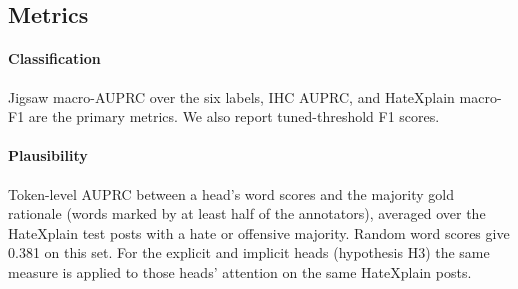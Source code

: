 \documentclass[preprint,12pt,authoryear]{elsarticle}
\begin{document}
\begin{table}[t]
\centering
\caption{Models compared. All use RoBERTa-base unless stated.}
\label{tab:models}
\small
{}
\end{table}

\subsection{Metrics}
\paragraph{Classification} Jigsaw macro-AUPRC over the six labels, IHC AUPRC, and HateXplain macro-F1 are the primary metrics. We also report tuned-threshold F1 scores.

\paragraph{Plausibility} Token-level AUPRC between a head's word scores and the majority gold rationale (words marked by at least half of the annotators), averaged over the HateXplain test posts with a hate or offensive majority. Random word scores give 0.381 on this set. For the explicit and implicit heads (hypothesis H3) the same measure is applied to those heads' attention on the same HateXplain posts.
\end{document}
